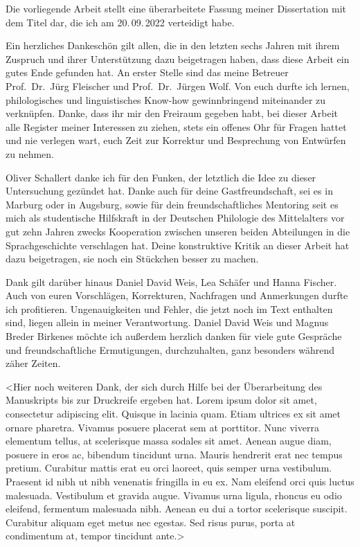 \addchap{\lsPrefaceTitle}

Die vorliegende Arbeit stellt eine überarbeitete Fassung meiner Dissertation
mit dem Titel  dar, die ich am 20.\,09.\,2022 verteidigt habe.
 
Ein herzliches Dankeschön gilt allen, die in den letzten sechs Jahren mit ihrem
Zuspruch und ihrer Unterstützung dazu beigetragen haben, dass diese Arbeit ein
gutes Ende gefunden hat. An erster Stelle sind das meine Betreuer
Prof.~Dr.~Jürg Fleischer und Prof.~Dr.~Jürgen Wolf. Von euch durfte ich lernen,
philologisches und linguistisches Know-how gewinnbringend miteinander zu
verknüpfen. Danke, dass ihr mir den Freiraum gegeben habt, bei dieser Arbeit
alle Register meiner Interessen zu ziehen, stets ein offenes Ohr für Fragen
hattet und nie verlegen wart, euch Zeit zur Korrektur und Besprechung von
Entwürfen zu nehmen.

Oliver Schallert danke ich für den Funken, der letztlich die Idee zu dieser
Untersuchung gezündet hat. Danke auch für deine Gastfreundschaft, sei es in
Marburg oder in Augsburg, sowie für dein freundschaftliches Mentoring seit es
mich als studentische Hilfskraft in der Deutschen Philologie des Mittelalters
vor gut zehn Jahren zwecks Kooperation zwischen unseren beiden Abteilungen in
die Sprachgeschichte verschlagen hat. Deine konstruktive Kritik an dieser
Arbeit hat dazu beigetragen, sie noch ein Stückchen besser zu machen.

Dank gilt darüber hinaus Daniel David Weis, Lea Schäfer und Hanna Fischer. Auch
von euren Vorschlägen, Korrekturen, Nachfragen und Anmerkungen durfte ich
profitieren. Ungenauigkeiten und Fehler, die jetzt noch im Text enthalten sind,
liegen allein in meiner Verantwortung. Daniel David Weis und Magnus Breder
Birkenes möchte ich außerdem herzlich danken für viele gute Gespräche und
freundschaftliche Ermutigungen, durchzuhalten, ganz besonders während zäher
Zeiten.

<Hier noch weiteren Dank, der sich durch Hilfe bei der Überarbeitung des
Manuskripts bis zur Druckreife ergeben hat. Lorem ipsum dolor sit amet,
consectetur adipiscing elit. Quisque in lacinia quam. Etiam ultrices ex sit
amet ornare pharetra. Vivamus posuere placerat sem at porttitor. Nunc viverra
elementum tellus, at scelerisque massa sodales sit amet. Aenean augue diam,
posuere in eros ac, bibendum tincidunt urna. Mauris hendrerit erat nec tempus
pretium. Curabitur mattis erat eu orci laoreet, quis semper urna vestibulum.
Praesent id nibh ut nibh venenatis fringilla in eu ex. Nam eleifend orci quis
luctus malesuada. Vestibulum et gravida augue. Vivamus urna ligula, rhoncus eu
odio eleifend, fermentum malesuada nibh. Aenean eu dui a tortor scelerisque
suscipit. Curabitur aliquam eget metus nec egestas. Sed risus purus, porta at
condimentum at, tempor tincidunt ante.>

